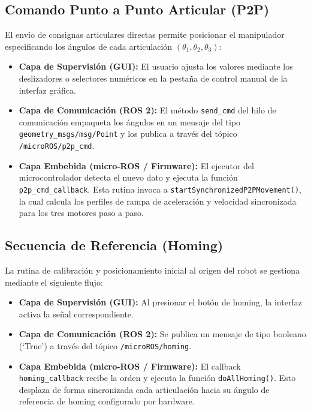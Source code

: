 \documentclass[12pt, a4paper]{report}
\begin{document}
\subsection{Comando Punto a Punto Articular (P2P)}
El envío de consignas articulares directas permite posicionar el manipulador especificando los ángulos de cada articulación $(\theta_1, \theta_2, \theta_3)$:
\begin{itemize}
    \item \textbf{Capa de Supervisión (GUI):} El usuario ajusta los valores mediante los deslizadores o selectores numéricos en la pestaña de control manual de la interfaz gráfica.
    \item \textbf{Capa de Comunicación (ROS 2):} El método \texttt{send\_cmd} del hilo de comunicación empaqueta los ángulos en un mensaje del tipo \texttt{geometry\_msgs/msg/Point} y los publica a través del tópico \texttt{/microROS/p2p\_cmd}.
    \item \textbf{Capa Embebida (micro-ROS / Firmware):} El ejecutor del microcontrolador detecta el nuevo dato y ejecuta la función \texttt{p2p\_cmd\_callback}. Esta rutina invoca a \texttt{startSynchronizedP2PMovement()}, la cual calcula los perfiles de rampa de aceleración y velocidad sincronizada para los tres motores paso a paso.
\end{itemize}

\subsection{Secuencia de Referencia (Homing)}
La rutina de calibración y posicionamiento inicial al origen del robot se gestiona mediante el siguiente flujo:
\begin{itemize}
    \item \textbf{Capa de Supervisión (GUI):} Al presionar el botón de homing, la interfaz activa la señal correspondiente.
    \item \textbf{Capa de Comunicación (ROS 2):} Se publica un mensaje de tipo booleano (`True') a través del tópico \texttt{/microROS/homing}.
    \item \textbf{Capa Embebida (micro-ROS / Firmware):} El callback \texttt{homing\_callback} recibe la orden y ejecuta la función \texttt{doAllHoming()}. Esto desplaza de forma sincronizada cada articulación hacia su ángulo de referencia de homing configurado por hardware.
\end{itemize}
\end{document}
